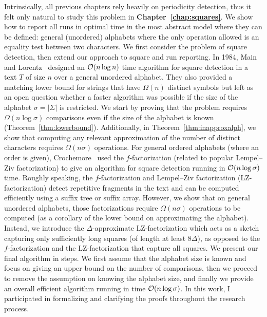 Intrinsically, all previous chapters rely heavily on periodicity detection, thus it felt only natural to study this problem in \textbf{Chapter~\ref{chap:squares}}. We show how to report all runs  in optimal time in the most abstract model where they can be defined: general (unordered) alphabets where the only operation allowed is an equality test between two characters. 
We first consider the problem of square detection, then extend our approach to square and run reporting.
In 1984, Main and Lorentz~\cite{Main1984} designed an $\mathcal{O}(n\log n)$ time algorithm for square detection in a text $T$ of size $n$ over a general unordered alphabet. They also provided a matching lower bound for strings that have $\Omega(n)$ distinct symbols but left as an open question whether a faster algorithm was possible if the size of the alphabet $\sigma=|\Sigma|$ is restricted.
We start by proving that the problem requires $\Omega(n \log \sigma)$ comparisons even if the size of the alphabet is known (Theorem~\ref{thm:lowerbound}). Additionally, in Theorem~\ref{thm:inapproxalph}, we show that computing any relevant approximation of the number of distinct characters requires $\Omega(n\sigma)$ operations.
For general ordered alphabets (where an order is given), Crochemore~\cite{Crochemore1986} used the $f$-factorization (related to popular Lempel--Ziv factorization) to give an algorithm for square detection running in $\mathcal{O}(n\log \sigma)$ time. Roughly speaking, the $f$-factorization and Lempel--Ziv factorization (LZ-factorization) detect repetitive fragments in the text and can be computed efficiently using a suffix tree or suffix array. However,  we show that on general unordered alphabets, those factorizations require $\Omega(n\sigma)$ operations to be computed (as a corollary of the lower bound on approximating the alphabet). %
Instead, we introduce the $\Delta$-approximate LZ-factorization which acts as a sketch capturing only sufficiently long squares (of length at least $8\Delta$), as opposed to the $f$-factorization and the LZ-factorization that capture all squares.
We present our final algorithm in steps. We first assume that the alphabet size is known and focus on giving an upper bound on the number of comparisons, then we proceed to remove the assumption on knowing the alphabet size, and finally we provide an overall efficient algorithm running in time $\mathcal{O}(n\log\sigma)$.
In this work, I participated in formalizing and clarifying the proofs throughout the research process. %

